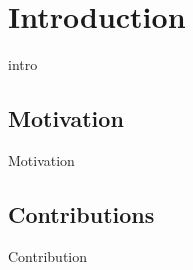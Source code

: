\chapter{Introduction}

intro


\section{Motivation}

Motivation


\section{Contributions}

Contribution